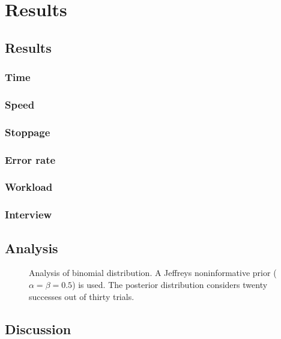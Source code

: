 \chapter{Results}
\label{ch:results}
\section{Results}
  \subsection{Time}
  \subsection{Speed}
  \subsection{Stoppage}
  \subsection{Error rate}
  \subsection{Workload}
  \subsection{Interview}
\section{Analysis}
\begin{figure}[h]
  \centering
  
  \caption[Overall result curve]{Analysis of binomial distribution. A Jeffreys noninformative prior ($\alpha = \beta = 0.5$) is used. The posterior distribution considers twenty successes out of thirty trials.}
  \label{fig:binom}
\end{figure}
\section{Discussion}
